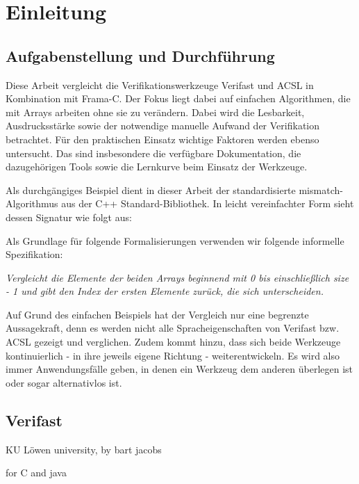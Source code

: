 ﻿\chapter{Einleitung}

\section{Aufgabenstellung und Durchführung}
Diese Arbeit vergleicht die Verifikationswerkzeuge Verifast und ACSL in Kombination mit Frama-C. 
Der Fokus liegt dabei auf einfachen Algorithmen, die mit Arrays arbeiten ohne sie zu verändern.
Dabei wird die Lesbarkeit, Ausdrucksstärke sowie der notwendige manuelle Aufwand der Verifikation betrachtet.
Für den praktischen Einsatz wichtige Faktoren werden ebenso untersucht. Das sind insbesondere die verfügbare 
Dokumentation, die dazugehörigen Tools sowie die Lernkurve beim Einsatz der Werkzeuge.

Als durchgängiges Beispiel dient in dieser Arbeit der standardisierte mismatch-Algorithmus aus
der C++ Standard-Bibliothek. In leicht vereinfachter Form sieht dessen Signatur wie folgt aus:



Als Grundlage für folgende Formalisierungen verwenden wir folgende informelle Spezifikation:

\emph{Vergleicht die Elemente der beiden Arrays beginnend mit 0 bis einschließlich size - 1 und gibt den
Index der ersten Elemente zurück, die sich unterscheiden.}

Auf Grund des einfachen Beispiels hat der Vergleich nur eine begrenzte Aussagekraft, denn es werden nicht alle
Spracheigenschaften von Verifast bzw. ACSL gezeigt und verglichen. Zudem kommt hinzu, dass sich beide Werkzeuge
kontinuierlich - in ihre jeweils eigene Richtung - weiterentwickeln. Es wird also immer Anwendungsfälle geben,
in denen ein Werkzeug dem anderen überlegen ist oder sogar alternativlos ist.



\section{Verifast}
\label{sec:verifast}

KU Löwen university, by bart jacobs


for C and java


